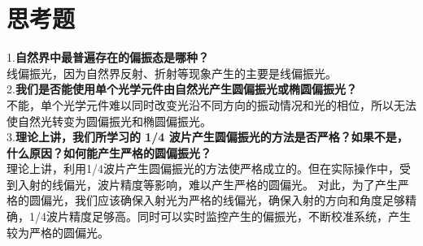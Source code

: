 \documentclass{article}
\begin{document}
\section{思考题}
1.\textbf{自然界中最普遍存在的偏振态是哪种？}\\
\hspace*{2em}线偏振光，因为自然界反射、折射等现象产生的主要是线偏振光。\\
2.\textbf{我们是否能使用单个光学元件由自然光产生圆偏振光或椭圆偏振光？}\\
\hspace*{2em}不能，单个光学元件难以同时改变光沿不同方向的振动情况和光的相位，所以无法使自然光转变为圆偏振光和椭圆偏振光。\\
3.\textbf{理论上讲，我们所学习的 1/4 波片产生圆偏振光的方法是否严格？如果不是，什么原因？如何能产生严格的圆偏振光？}\\
\hspace*{2em}理论上讲，利用1/4波片产生圆偏振光的方法使严格成立的。但在实际操作中，受到入射的线偏光，波片精度等影响，难以产生严格的圆偏光。
对此，为了产生严格的圆偏光，我们应该确保入射光为严格的线偏光，确保入射的方向和角度足够精确，1/4波片精度足够高。同时可以实时监控产生的偏振光，不断校准系统，产生较为严格的圆偏光。
\end{document}
